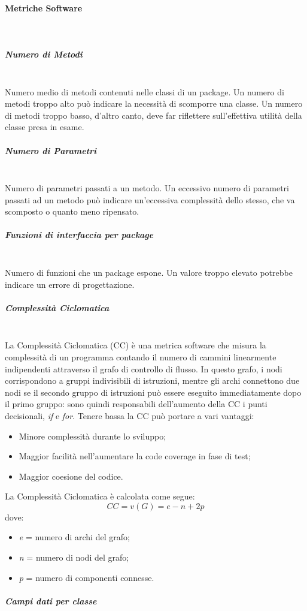 \paragraph{Metriche Software}\mbox{}\\
\subparagraph{Numero di Metodi}\mbox{}\\
Numero medio di metodi contenuti nelle classi di un package. Un numero di metodi troppo alto può indicare la necessità di scomporre una classe. Un numero di metodi troppo basso, d'altro canto, deve far riflettere sull'effettiva utilità della classe presa in esame.
\subparagraph{Numero di Parametri}\mbox{}\\
Numero di parametri passati a un metodo. Un eccessivo numero di parametri passati ad un metodo può indicare un'eccessiva complessità dello stesso, che va scomposto o quanto meno ripensato.
\subparagraph{Funzioni di interfaccia per package}\mbox{}\\
Numero di funzioni che un package espone. Un valore troppo elevato potrebbe indicare un errore di progettazione.
\subparagraph{Complessità Ciclomatica}\mbox{}\\
La Complessità Ciclomatica (CC) è una metrica software che misura la complessità di un programma contando il numero di cammini linearmente indipendenti attraverso il grafo di controllo di flusso. In questo grafo, i nodi corrispondono a gruppi indivisibili di istruzioni, mentre gli archi connettono due nodi se il secondo gruppo di istruzioni può essere eseguito immediatamente dopo il primo gruppo: sono quindi responsabili dell'aumento della CC i punti decisionali, \emph{if} e \emph{for}.
Tenere bassa la CC può portare a vari vantaggi:
\begin{itemize}
	\item Minore complessità durante lo sviluppo;
	\item Maggior facilità nell'aumentare la code coverage in fase di test;
	\item Maggior coesione del codice.
\end{itemize}
La Complessità Ciclomatica è calcolata come segue:
\[
CC = v(G) = e - n + 2p
\]
dove:
\begin{itemize}
	\item \emph{e} = numero di archi del grafo;
	\item \emph{n} = numero di nodi del grafo;
	\item \emph{p} = numero di componenti connesse.
\end{itemize}
\subparagraph{Campi dati per classe}\mbox{}\\
